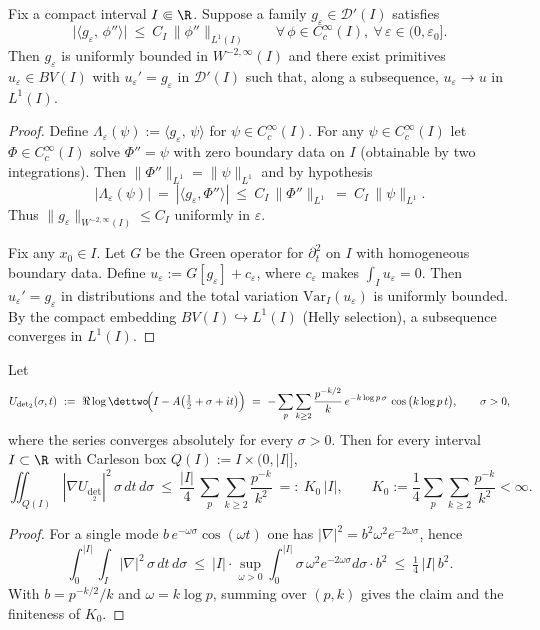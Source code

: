 \begin{lemma}\label{lem:desmooth-L1}
Fix a compact interval \(I\Subset\R\).
Suppose a family \(g_\varepsilon\in\mathcal D'(I)\) satisfies
\[
  \big|\langle g_\varepsilon,\,\phi''\rangle\big|\ \le\ C_I\,\|\phi''\|_{L^1(I)}\qquad\forall\,\phi\in C_c^\infty(I),\ \forall\,\varepsilon\in(0,\varepsilon_0].
\]
Then \(g_\varepsilon\) is uniformly bounded in \(W^{-2,\infty}(I)\) and there exist primitives \(u_\varepsilon\in BV(I)\) with \(u_\varepsilon' = g_\varepsilon\) in \(\mathcal D'(I)\) such that, along a subsequence, \(u_\varepsilon\to u\) in \(L^1(I)\).
\end{lemma}
\begin{proof}
Define \(\Lambda_\varepsilon(\psi):=\langle g_\varepsilon,\,\psi\rangle\) for \(\psi\in C_c^\infty(I)\).
For any \(\psi\in C_c^\infty(I)\) let \(\Phi\in C_c^\infty(I)\) solve \(\Phi''=\psi\) with zero boundary data on \(I\) (obtainable by two integrations).
Then \(\|\Phi''\|_{L^1}=\|\psi\|_{L^1}\) and by hypothesis
\[
  |\Lambda_\varepsilon(\psi)|
  \ =\ |\langle g_\varepsilon,\Phi''\rangle|
  \ \le\ C_I\,\|\Phi''\|_{L^1}
  \ =\ C_I\,\|\psi\|_{L^1}.
\]
Thus \(\|g_\varepsilon\|_{W^{-2,\infty}(I)}\le C_I\) uniformly in \(\varepsilon\).

Fix any \(x_0\in I\).
Let \(G\) be the Green operator for \(\partial_t^2\) on \(I\) with homogeneous boundary data.
Define \(u_\varepsilon:=G[g_\varepsilon]+c_\varepsilon\), where \(c_\varepsilon\) makes \(\int_I u_\varepsilon=0\).
Then \(u_\varepsilon' = g_\varepsilon\) in distributions and the total variation \(\mathrm{Var}_I(u_\varepsilon)\) is uniformly bounded.
By the compact embedding \(BV(I)\hookrightarrow L^1(I)\) (Helly selection), a subsequence converges in \(L^1(I)\).
\end{proof}

\begin{lemma}\label{lem:carleson-arith}
Let
\[
 U_{\det_2}(\sigma,t)\ :=\ \Re\log\dettwo\!\Big(I-A\big(\tfrac12+\sigma+it\big)\Big)
 \ =\ -\sum_{p}\sum_{k\ge 2}\frac{p^{-k/2}}{k}\,e^{-k\log p\,\sigma}\,\cos\big(k\log p\,t\big),\qquad \sigma>0,
\]
where the series converges absolutely for every \(\sigma>0\).
Then for every interval \(I\subset\R\) with Carleson box \(Q(I):=I\times(0,|I|]\),
\[
 \iint_{Q(I)} |\nabla U_{\det_2}|^2\,\sigma\,dt\,d\sigma\ \le\ \frac{|I|}{4}\,\sum_{p}\sum_{k\ge 2}\frac{p^{-k}}{k^2}
 \ =:\ K_0\,|I|,\qquad K_0:=\frac{1}{4}\sum_{p}\sum_{k\ge 2}\frac{p^{-k}}{k^2}<\infty.
\]
\end{lemma}
\begin{proof}
For a single mode \(b\,e^{-\omega\sigma}\cos(\omega t)\) one has \(|\nabla|^2=b^2\omega^2e^{-2\omega\sigma}\), hence
\[
 \int_0^{|I|}\!\int_I |\nabla|^2\,\sigma\,dt\,d\sigma
 \ \le\ |I|\cdot\sup_{\omega>0}\int_0^{|I|}\sigma\,\omega^2e^{-2\omega\sigma}d\sigma\cdot b^2
 \ \le\ \tfrac14\,|I|\,b^2.
\]
With \(b=p^{-k/2}/k\) and \(\omega=k\log p\), summing over \((p,k)\) gives the claim and the finiteness of \(K_0\).
\end{proof}

